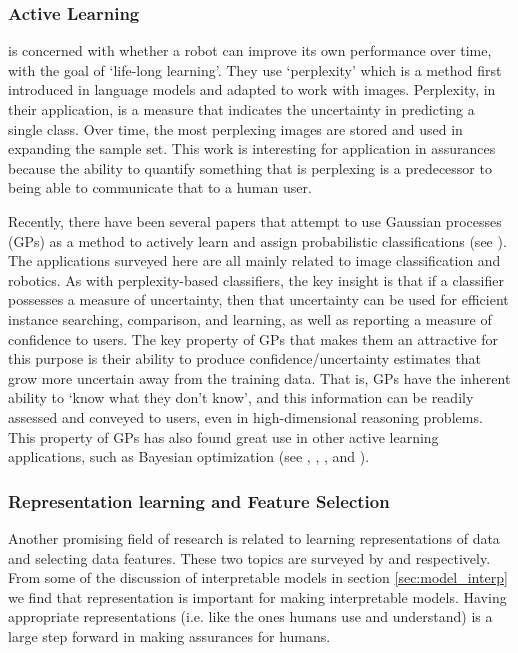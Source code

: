 \subsubsection{Active Learning} \label{sec:active_learning}
    \citet{Paul2011-vr} is concerned with whether a robot can improve its own performance over time, with the goal of `life-long learning'. They use `perplexity' which is a method first introduced in language models and adapted to work with images. Perplexity, in their application, is a measure that indicates the uncertainty in predicting a single class. Over time, the most perplexing images are stored and used in expanding the sample set. This work is interesting for application in assurances because the ability to quantify something that is perplexing is a predecessor to being able to communicate that to a human user.

    Recently, there have been several papers that attempt to use Gaussian processes (GPs) as a method to actively learn and assign probabilistic classifications (see \citet{MacKay1992-sp,Triebel2016-kj,Triebel2013-ow,Triebel2013-ku,Grimmett2013-gj,Grimmett2016-yc,Berczi2015-rd,Dequaire2016-kh}). The applications surveyed here are all mainly related to image classification and robotics. As with perplexity-based classifiers, the key insight is that if a classifier possesses a measure of uncertainty, then that uncertainty can be used for efficient instance searching, comparison, and learning, as well as reporting a measure of confidence to users. The key property of GPs that makes them an attractive for this purpose is their ability to produce confidence/uncertainty estimates that grow more uncertain away from the training data. That is, GPs have the inherent ability to `know what they don't know', and this information can be readily assessed and conveyed to users, even in high-dimensional reasoning problems. This property of GPs has also found great use in other active learning applications, such as  Bayesian optimization (see \citet{Williams1998-kr}, \citet{Snoek2012-tt}, \citet{Brochu2010-tj}, and \citet{Israelsen2017-zb}).

\subsubsection{Representation learning and Feature Selection} \label{sec:rep_learning}
    Another promising field of research is related to learning representations of data and selecting data features. These two topics are surveyed by \citet{Bengio2013-uv} and \citet{Guyon2003-fj} respectively. From some of the discussion of interpretable models in section \ref{sec:model_interp} we find that representation is important for making interpretable models. Having appropriate representations (i.e. like the ones humans use and understand) is a large step forward in making assurances for humans.

